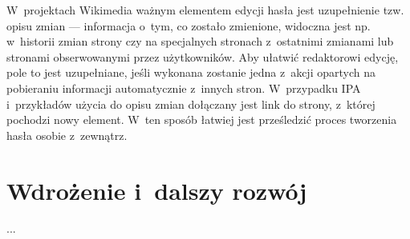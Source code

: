 W~projektach Wikimedia ważnym elementem edycji hasła jest uzupełnienie tzw. opisu zmian --- informacja o~tym, co zostało zmienione, widoczna jest np. w~historii zmian strony czy na specjalnych stronach z~ostatnimi zmianami lub stronami obserwowanymi przez użytkowników. Aby ułatwić redaktorowi edycję, pole to jest uzupełniane, jeśli wykonana zostanie jedna z~akcji opartych na pobieraniu informacji automatycznie z~innych stron. W~przypadku IPA i~przykładów użycia do opisu zmian dołączany jest link do strony, z~której pochodzi nowy element. W~ten sposób łatwiej jest prześledzić proces tworzenia hasła osobie z~zewnątrz.

\section{Wdrożenie i~dalszy rozwój}
\label{sec:impl-deploy}

...
